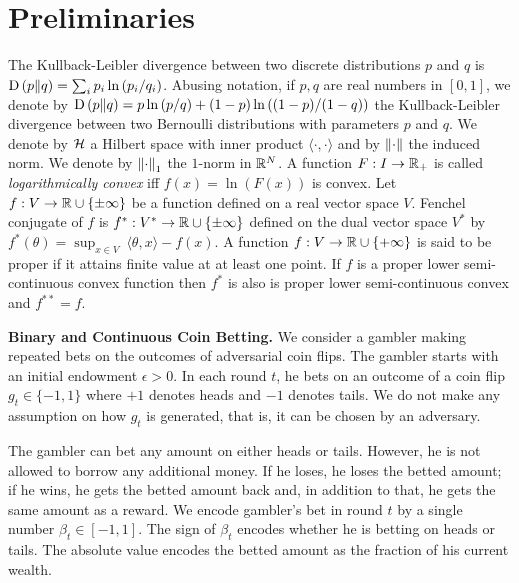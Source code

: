 \section{Preliminaries}
\label{sec:prel}

The Kullback-Leibler divergence between two discrete distributions $p$ and $q$
is $\operatorname*{D}\left({p}\middle\|{q}\right) = \sum_{i} p_i \ln\left( p_i/q_i \right)$. Abusing
notation, if $p,q$ are real numbers in $[0,1]$, we denote by $\operatorname*{D}\left({p}\middle\|{q}\right) = p \ln
\left(p/q \right) + (1-p) \ln \left((1-p)/(1-q) \right)$ the
Kullback-Leibler divergence between two Bernoulli distributions with parameters
$p$ and $q$.  We denote by $\mathcal{H}$ a Hilbert space with inner product $\langle
\cdot, \cdot\rangle$ and by $\left\|{\cdot}\right\|$ the induced norm.  We denote by
$\left\|{\cdot}\right\|_1$ the $1$-norm in $\mathbb{R}^N$.  A function $F:I \to \mathbb{R}_+$ is called
\emph{logarithmically convex} iff $f(x) = \ln(F(x))$ is convex.
Let $f:V \to \mathbb{R} \cup \{\pm\infty\}$ be a function defined on a real
vector space $V$. Fenchel conjugate of $f$ is $f^*:V^* \to \mathbb{R} \cup \{\pm
\infty\}$ defined on the dual vector space $V^*$ by $f^*(\theta) = \sup_{x \in
V} \ \langle \theta, x \rangle - f(x)$.  A function $f:V \to \mathbb{R} \cup \{+
\infty\}$ is said to be proper if  it attains finite
value at at least one point. If $f$ is a proper lower semi-continuous convex
function then $f^*$ is also is proper lower semi-continuous convex and
$f^{**}=f$.

\textbf{Binary and Continuous Coin Betting.} We consider a gambler making
repeated bets on the outcomes of adversarial coin flips. The gambler starts with an
initial endowment $\epsilon > 0$. In each round $t$, he bets on an outcome of a
coin flip $g_t \in \{-1,1\}$ where $+1$ denotes heads and $-1$ denotes tails.
We do not make any assumption on how $g_t$ is generated, that is, it can be
chosen by an adversary.

The gambler can bet any amount on either heads or tails. However, he is not
allowed to borrow any additional money. If he loses, he loses the betted amount; if he wins, he gets the betted amount back and, in addition to that, he
gets the same amount as a reward.  We encode gambler's bet in round $t$ by a
single number $\beta_t \in [-1,1]$. The sign of $\beta_t$ encodes whether he is
betting on heads or tails. The absolute value encodes the betted amount as the
fraction of his current wealth.

